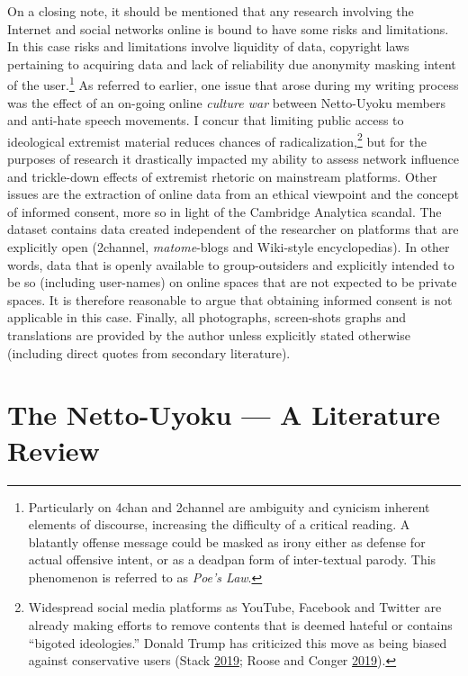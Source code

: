 \documentclass[10pt,british,A4paper,,openany]{memoir}
\begin{document}
On a closing note, it should be mentioned that any research involving
the Internet and social networks online is bound to have some risks and
limitations. In this case risks and limitations involve liquidity of
data, copyright laws pertaining to acquiring data and lack of
reliability due anonymity masking intent of the user.\footnote{Particularly
  on 4chan and 2channel are ambiguity and cynicism inherent elements of
  discourse, increasing the difficulty of a critical reading. A
  blatantly offense message could be masked as irony either as defense
  for actual offensive intent, or as a deadpan form of inter-textual
  parody. This phenomenon is referred to as \emph{Poe's Law}.} As
referred to earlier, one issue that arose during my writing process was
the effect of an on-going online \emph{culture war} between Netto-Uyoku
members and anti-hate speech movements. I concur that limiting public
access to ideological extremist material reduces chances of
radicalization,\footnote{Widespread social media platforms as YouTube,
  Facebook and Twitter are already making efforts to remove contents
  that is deemed hateful or contains ``bigoted ideologies.'' Donald
  Trump has criticized this move as being biased against conservative
  users (Stack \protect\hyperlink{ref-stack_trump_2019}{2019}; Roose and
  Conger \protect\hyperlink{ref-roose_youtube_2019}{2019}).} but for the
purposes of research it drastically impacted my ability to assess
network influence and trickle-down effects of extremist rhetoric on
mainstream platforms. Other issues are the extraction of online data
from an ethical viewpoint and the concept of informed consent, more so
in light of the Cambridge Analytica scandal. The dataset contains data
created independent of the researcher on platforms that are explicitly
open (2channel, \emph{matome}-blogs and Wiki-style encyclopedias). In
other words, data that is openly available to group-outsiders and
explicitly intended to be so (including user-names) on online spaces
that are not expected to be private spaces. It is therefore reasonable
to argue that obtaining informed consent is not applicable in this case.
Finally, all photographs, screen-shots graphs and translations are
provided by the author unless explicitly stated otherwise (including
direct quotes from secondary literature).

\newpage

\chapter{The Netto-Uyoku --- A Literature
Review}\label{the-netto-uyoku-a-literature-review}
\end{document}
